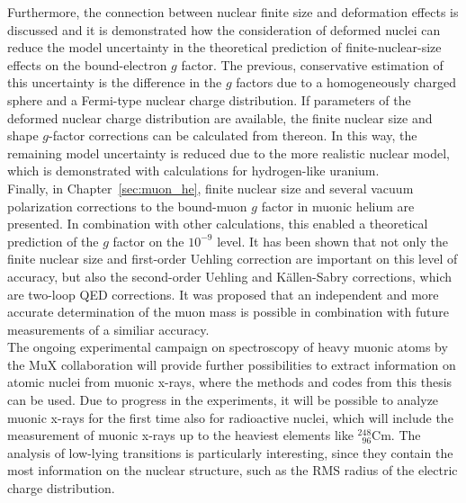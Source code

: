 Furthermore, the connection between nuclear finite size and deformation effects is discussed and it is demonstrated how the consideration of deformed nuclei can reduce the model uncertainty in the theoretical prediction of finite-nuclear-size effects on the bound-electron $g$ factor. The previous, conservative estimation of this uncertainty is the difference in the $g$ factors due to a homogeneously charged sphere and a Fermi-type nuclear charge distribution. If parameters of the deformed nuclear charge distribution are available, the finite nuclear size and shape $g$-factor corrections can be calculated from thereon. In this way, the remaining model uncertainty is reduced due to the more realistic nuclear model, which is demonstrated with calculations for hydrogen-like uranium.\\[11pt]%
%
Finally, in Chapter~\ref{sec:muon_he}, finite nuclear size and several vacuum polarization corrections to the bound-muon $g$ factor in muonic helium are presented. In combination with other calculations, this enabled a theoretical prediction of the $g$ factor on the $10^{-9}$ level. It has been shown that not only the finite nuclear size and first-order Uehling correction are important on this level of accuracy, but also the second-order Uehling and Källen-Sabry corrections, which are two-loop QED corrections.
It was proposed that an independent and more accurate determination of the muon mass is possible in combination with future measurements of a similiar accuracy.\\[11pt]%
%
The ongoing experimental campaign on spectroscopy of heavy muonic atoms by the MuX collaboration will provide further possibilities to extract information on atomic nuclei from muonic x-rays, where the methods and codes from this thesis can be used. 
Due to progress in the experiments, it will be possible to analyze muonic x-rays for the first time also for radioactive nuclei, which will include the measurement of muonic x-rays up to the heaviest elements like $_{\phantom{1}96}^{248}$Cm. 
The analysis of low-lying transitions is particularly interesting, since they contain the most information on the nuclear structure, such as the RMS radius of the electric charge distribution.

